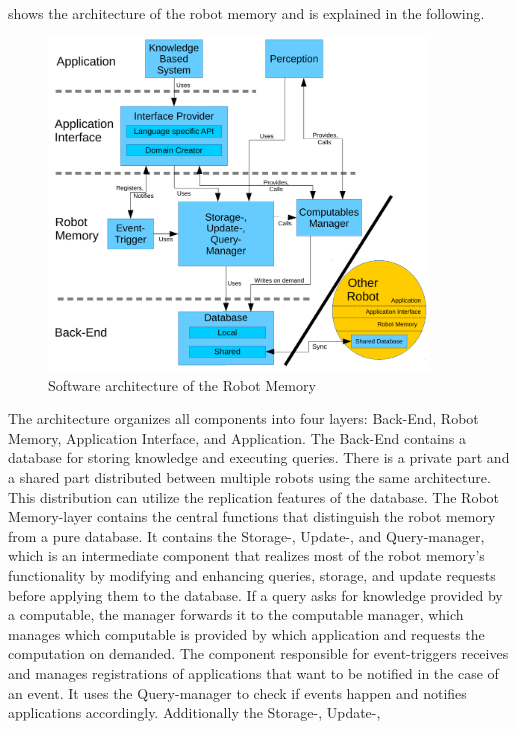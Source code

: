 { shows the architecture of the robot
memory and is explained in the following.
\begin{figure}
  \centering
  \includegraphics[width=0.9\textwidth]{architecture.pdf}
  \vspace{-5mm}
  \caption{Software architecture of the Robot Memory}
  \label{fig:arch}
  \vspace{-5mm}
\end{figure}
The architecture organizes all components into four layers: Back-End,
Robot Memory, Application Interface, and Application. The Back-End
contains a database for storing knowledge and executing
queries. There is a private part and a shared part distributed between
multiple robots using the same architecture. This distribution can
utilize the replication features of the database. The Robot
Memory-layer contains the central functions that distinguish the robot
memory from a pure database. It contains the Storage-, Update-, and
Query-manager, which is an intermediate component that realizes most of
the robot memory's functionality by modifying and enhancing queries,
storage, and update requests before applying them to the database. If a
query asks for knowledge provided by a computable, the manager forwards it to the
computable manager, which manages which computable is provided by
which application and requests the computation on demanded. The
component responsible for event-triggers receives and manages
registrations of applications that want to be notified in the case of
an event. It uses the Query-manager to check if events happen and
notifies applications accordingly. Additionally the Storage-, Update-,
}
